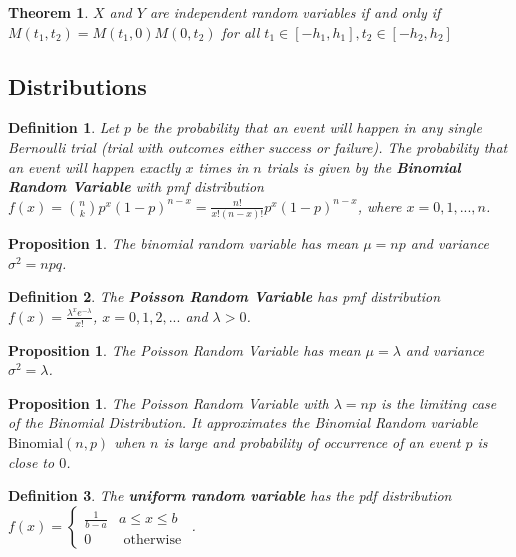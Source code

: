 \documentclass[12pt,twoside]{report}
\theoremstyle{thmstyle}
\newtheorem{defn}{Definition}
\newtheorem{thm}{Theorem}
\newtheorem{prop}[subsection]{Proposition}
\begin{document}
\begin{thm}
    $X$ and $Y$ are independent random variables if and only if $M(t_1, t_2) = M(t_1, 0) M(0, t_2)$ for all $t_1 \in [-h_1, h_1], t_2 \in [-h_2, h_2]$
\end{thm}


\subsection{Distributions}

\begin{defn}
    Let $p$ be the probability that an event will happen in any single Bernoulli trial (trial with outcomes either success or failure). The probability that an event will happen exactly $x$ times in $n$ trials is given by the \textbf{Binomial Random Variable} with pmf distribution $f(x) = {n \choose k} p^x (1-p)^{n-x} = \displaystyle \frac{n!}{x! (n-x)!} p^x (1-p)^{n-x}$, where $x = 0, 1, ... , n$.
\end{defn}

\begin{prop}
The binomial random variable has mean $\mu = np$ and variance $\sigma^2 = npq$.
\end{prop}

\begin{defn}
    The \textbf{Poisson Random Variable} has pmf distribution $f(x) = \displaystyle \frac{\lambda^x e^{-\lambda}}{x!}$, $x = 0, 1, 2, ...$ and $\lambda > 0$.
\end{defn}

\begin{prop}
The Poisson Random Variable has mean $\mu = \lambda$ and variance $\sigma^2 = \lambda$.
\end{prop}
\begin{prop}
    The Poisson Random Variable with $\lambda = np$ is the limiting case of the Binomial Distribution. It approximates the Binomial Random variable $\text{Binomial}(n,p)$ when $n$ is large and probability of occurrence of an event $p$ is close to $0$.
\end{prop}

\begin{defn}    
    The \textbf{uniform random variable} has the pdf distribution $f(x) = \begin{cases} \frac{1}{b-a} & a \leq x \leq b \\ 0 & \text { otherwise }\end{cases}$.
\end{defn}
\end{document}
